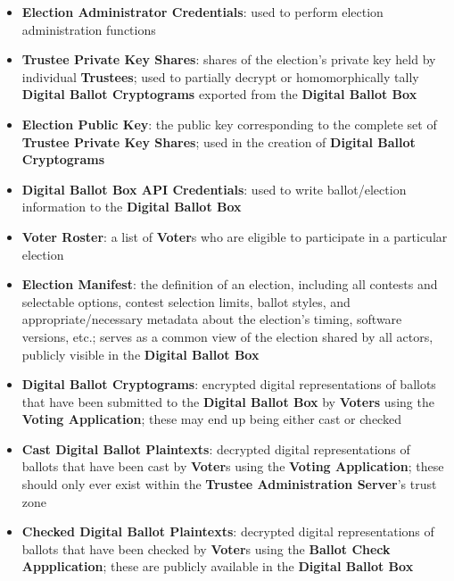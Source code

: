 \documentclass[10pt,letterpaper]{article}
\begin{document}
\begin{itemize}

    \item \textbf{Election Administrator Credentials}: used to perform election administration functions

    \item \textbf{Trustee Private Key Shares}: shares of the election's private key held by individual \textbf{Trustees}; used to partially decrypt or homomorphically tally \textbf{Digital Ballot Cryptograms} exported from the \textbf{Digital Ballot Box}

    \item \textbf{Election Public Key}: the public key corresponding to the complete set of \textbf{Trustee Private Key Shares}; used in the creation of \textbf{Digital Ballot Cryptograms}

    \item \textbf{Digital Ballot Box API Credentials}: used to write ballot/election information to the \textbf{Digital Ballot Box}

    \item \textbf{Voter Roster}: a list of \textbf{Voter}s who are eligible to participate in a particular election

    \item \textbf{Election Manifest}: the definition of an election, including all contests and selectable options, contest selection limits, ballot styles, and appropriate/necessary metadata about the election's timing, software versions, etc.; serves as a common view of the election shared by all actors, publicly visible in the \textbf{Digital Ballot Box}

    \item \textbf{Digital Ballot Cryptograms}: encrypted digital representations of ballots that have been submitted to the \textbf{Digital Ballot Box} by \textbf{Voters} using the \textbf{Voting Application}; these may end up being either cast or checked

    \item \textbf{Cast Digital Ballot Plaintexts}: decrypted digital representations of ballots that have been cast by \textbf{Voter}s using the \textbf{Voting Application}; these should only ever exist within the \textbf{Trustee Administration Server}'s trust zone

    \item \textbf{Checked Digital Ballot Plaintexts}: decrypted digital representations of ballots that have been checked by \textbf{Voter}s using the \textbf{Ballot Check Appplication}; these are publicly available in the \textbf{Digital Ballot Box}


\end{itemize}
\end{document}

